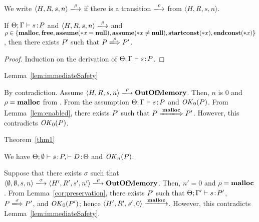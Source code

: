 We write \(\langle H, R, s, n \rangle \xlongrightarrow{\rho}\) if
there is a transition \(\xlongrightarrow{\rho}\) from \(\langle H, R,
s, n \rangle\).

\begin{lemma}
\label{lem:enabled}
If \(\Theta; \Gamma \vdash s \!:\! P\) and \(\langle H, R, s, n \rangle
\xlongrightarrow{\rho}\) and \(\rho \in \{\mathbf{malloc}, \mathbf{free}, \mathbf{assume}(*x = \mathbf{null}), \mathbf{assume}(*x \ne \mathbf{null}), \mathbf{startconst}(*x), \mathbf{endconst}(*x)\}\), then
there exists \(P'\) such that \(P \xLongrightarrow{\rho} P'\).
\end{lemma}

\begin{proof}
Induction on the derivation of \(\Theta; \Gamma \vdash s \!:\! P\).
\end{proof}

\begin{pfof}{Lemma~\ref{lem:immediateSafety}}

By contradiction.  Assume \(\langle H, R, s, n \rangle
\xlongrightarrow{\rho} \OVERFLOW\). Then, \(n\) is \(0\) and \(\rho =
\mathbf{malloc}\) from .  From the assumption \(\Theta;\Gamma
\vdash s \!:\! P\) and \(\mathit{OK}_0(P)\).  From Lemma~\ref{lem:enabled},
there exists \(P'\) such that \(P \xLongrightarrow{\Malloc} P'\).
However, this contradicts \(\mathit{OK}_0(P)\).


\end{pfof}


\begin{pfof}{Theorem~\ref{thm1}}

We have \(\Theta;\emptyset \vdash s\!:\! P, \vdash D\!:\! \Theta\) and
\(\mathit{OK}_n(P)\).

Suppose that there exists \(\sigma\) such that \(\langle \emptyset,
\emptyset, s, n\rangle \xlongrightarrow{\sigma} \langle H', R', s',
n'\rangle \xlongrightarrow{\rho} \OVERFLOW\).  Then, \(n' = 0\) and
\(\rho = \mathbf{malloc}\).  From Lemma~\ref{cor:preservation}, there exists
\(P'\) such that \(\Theta; \Gamma' \vdash s \!:\! P'\), \(P
\xLongrightarrow{\sigma} P'\), and \(\mathit{OK}_0(P')\); hence \(\langle H',
R', s', 0\rangle \xlongrightarrow{\Malloc}\).  However, this
contradicts Lemma~\ref{lem:immediateSafety}.

\end{pfof}
